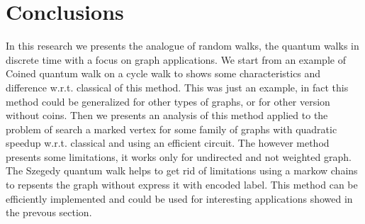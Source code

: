 \section{Conclusions}

In this research we presents the analogue of random walks, the quantum walks in discrete time with a focus on graph applications. We start from 
an example of Coined quantum walk on a cycle walk to shows some characteristics and difference w.r.t. classical of this method. This was just
an example, in fact this method could be generalized for other types of graphs, or for other version without coins. Then we presents 
an analysis of this method applied to the problem of search a marked vertex for some family of graphs with quadratic speedup w.r.t. classical
and using an efficient circuit. The however method presents some limitations, it works only for undirected and not weighted graph. The Szegedy
quantum walk helps to get rid of limitations using a markow chains to repsents the graph without express it with encoded label. This method
can be efficiently implemented and could be used for interesting applications showed in the prevous section.    